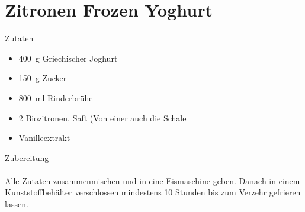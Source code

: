 \section*{Zitronen Frozen Yoghurt}
\ihead{}\ohead{}
\cfoot{}
{\Large Zutaten}
\begin{multicols}{2}
\begin{itemize}
    \item \SI{400}{g} Griechischer Joghurt
    \item \SI{150}{g} Zucker
    \item \SI{800}{ml} Rinderbrühe
    \item \num{2} Biozitronen, Saft (Von einer auch die Schale
    \item Vanilleextrakt
\end{itemize}
\end{multicols}
\noindent
{\Large Zubereitung}\\
\\
Alle Zutaten zusammenmischen und in eine Eismaschine geben.
Danach in einem Kunststoffbehälter verschlossen mindestens 10 Stunden bis zum Verzehr gefrieren lassen. 
